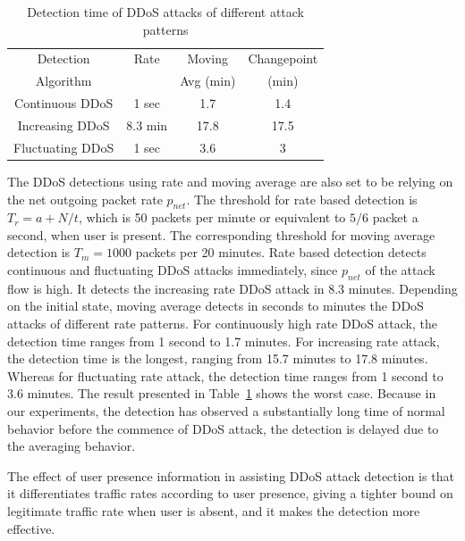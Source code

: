 \begin{table}[!t]
  \centering
  \begin{tabular}{|c|c|c|c|}
  \hline
  Detection & Rate & Moving & Changepoint \\
  Algorithm & & Avg (min) & (min) \\
  \hline
  Continuous DDoS  & 1 sec & 1.7  & 1.4   \\
  \hline
  Increasing DDoS & 8.3 min & 17.8  & 17.5   \\
  \hline
  Fluctuating DDoS & 1 sec &  3.6  & 3   \\ [0.5ex]
  \hline
  \end{tabular}
  \caption{Detection time of DDoS attacks of different attack patterns}
  \label{tbl:detect-DDoS}
\end{table}

The DDoS detections using rate and moving average are also set to be relying on the net outgoing packet rate $p_{net}$. The threshold for rate based detection is $T_r = a + N/t$, which is 50 packets per minute or equivalent to $5/6$ packet a second, when user is present. The corresponding threshold for moving average detection is $T_m = 1000$ packets per 20 minutes.
Rate based detection detects continuous and fluctuating DDoS attacks immediately, since $p_{net}$ of the attack flow is high. It detects the increasing rate DDoS attack in 8.3 minutes. 
Depending on the initial state, moving average detects in seconds to minutes the DDoS attacks of different rate patterns. For continuously high rate DDoS attack, the detection time ranges from 1 second to 1.7 minutes. For increasing rate attack, the detection time is the longest, ranging from 15.7 minutes to 17.8 minutes. Whereas for fluctuating rate attack, the detection time ranges from 1 second to 3.6 minutes. The result presented in Table~\ref{tbl:detect-DDoS} shows the worst case. Because in our experiments, the detection has observed a substantially long time of normal behavior before the commence of DDoS attack, the detection is delayed due to the averaging behavior.


The effect of user presence information in assisting DDoS attack detection is that it differentiates traffic rates according to user presence, giving a tighter bound on legitimate traffic rate when user is absent, and it makes the detection more effective. 
